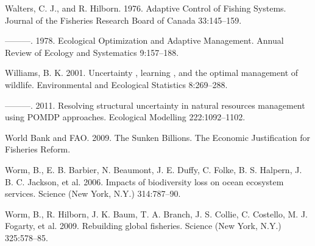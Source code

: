\documentclass[3p]{elsarticle} %
\begin{document}
\hypertarget{ref-Walters1976}{}
Walters, C. J., and R. Hilborn. 1976. Adaptive Control of Fishing
Systems. Journal of the Fisheries Research Board of Canada 33:145--159.

\hypertarget{ref-Walters1978}{}
---------. 1978. Ecological Optimization and Adaptive Management. Annual
Review of Ecology and Systematics 9:157--188.

\hypertarget{ref-Williams2001}{}
Williams, B. K. 2001. Uncertainty , learning , and the optimal
management of wildlife. Environmental and Ecological Statistics
8:269--288.

\hypertarget{ref-Williams2011}{}
---------. 2011. Resolving structural uncertainty in natural resources
management using POMDP approaches. Ecological Modelling 222:1092--1102.

\hypertarget{ref-FAO2009}{}
World Bank and FAO. 2009. The Sunken Billions. The Economic
Justification for Fisheries Reform.

\hypertarget{ref-Worm2006}{}
Worm, B., E. B. Barbier, N. Beaumont, J. E. Duffy, C. Folke, B. S.
Halpern, J. B. C. Jackson, et al. 2006. Impacts of biodiversity loss on
ocean ecosystem services. Science (New York, N.Y.) 314:787--90.

\hypertarget{ref-Worm2009}{}
Worm, B., R. Hilborn, J. K. Baum, T. A. Branch, J. S. Collie, C.
Costello, M. J. Fogarty, et al. 2009. Rebuilding global fisheries.
Science (New York, N.Y.) 325:578--85.
\end{document}
